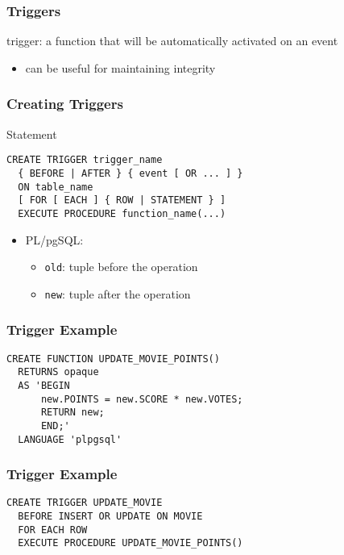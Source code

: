 \documentclass[dvipsnames]{beamer}
\theoremstyle{plain}
\begin{document}
\begin{frame}
  \frametitle{Triggers}

  \begin{definition}
    \alert{trigger}: a function that will be automatically activated on an event
  \end{definition}

  \begin{itemize}
    \item can be useful for maintaining integrity
  \end{itemize}
\end{frame}

\begin{frame}[fragile]
  \frametitle{Creating Triggers}

  \begin{block}{Statement}
    \begin{lstlisting}
CREATE TRIGGER trigger_name
  { BEFORE | AFTER } { event [ OR ... ] }
  ON table_name
  [ FOR [ EACH ] { ROW | STATEMENT } ]
  EXECUTE PROCEDURE function_name(...)
    \end{lstlisting}
  \end{block}

  \begin{itemize}
    \item PL/pgSQL:
    \begin{itemize}
      \item \lstinline!old!: tuple before the operation
      \item \lstinline!new!: tuple after the operation
    \end{itemize}
  \end{itemize}
\end{frame}

\begin{frame}[fragile]
  \frametitle{Trigger Example}

  \begin{example}
    \begin{lstlisting}
CREATE FUNCTION UPDATE_MOVIE_POINTS()
  RETURNS opaque
  AS 'BEGIN
      new.POINTS = new.SCORE * new.VOTES;
      RETURN new;
      END;'
  LANGUAGE 'plpgsql'
    \end{lstlisting}
  \end{example}
\end{frame}

\begin{frame}[fragile]
  \frametitle{Trigger Example}

  \begin{example}
    \begin{lstlisting}
CREATE TRIGGER UPDATE_MOVIE
  BEFORE INSERT OR UPDATE ON MOVIE
  FOR EACH ROW
  EXECUTE PROCEDURE UPDATE_MOVIE_POINTS()
    \end{lstlisting}
  \end{example}
\end{frame}
\end{document}
